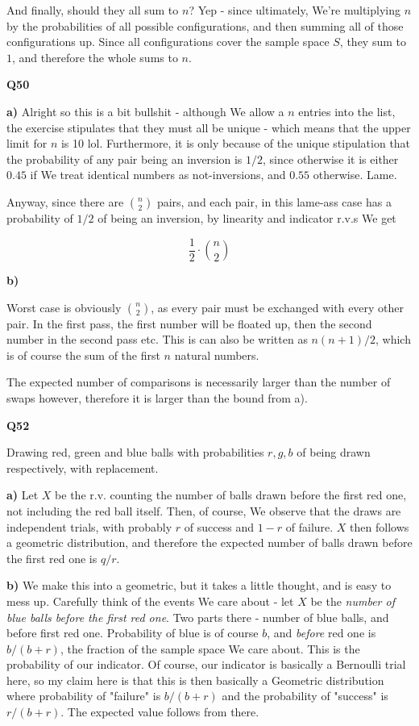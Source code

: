 \documentclass{article}
\begin{document}
		And finally, should they all sum to $n$? Yep - since ultimately, We're multiplying $n$ by the probabilities of all possible configurations, and then summing all of those configurations up. Since all configurations cover the sample space $S$, they sum to $1$, and therefore the whole sums to $n$.
		
		\hfill
		
		\textbf{Q50}
		
		\textbf{a)} Alright so this is a bit bullshit - although We allow a $n$ entries into the list, the exercise stipulates that they must all be unique - which means that the upper limit for $n$ is 10 lol. Furthermore, it is only because of the unique stipulation that the probability of any pair being an inversion is $1/2$, since otherwise it is either $0.45$ if We treat identical numbers as not-inversions, and $0.55$ otherwise. Lame. 
		
		Anyway, since there are ${n\choose 2}$ pairs, and each pair, in this lame-ass case has a probability of $1/2$ of being an inversion, by linearity and indicator r.v.s We get
		
		\[ \frac{1}{2}\cdot{n\choose 2} \] 
		
		\textbf{b)}
		
		Worst case is obviously ${n\choose 2}$, as every pair must be exchanged with every other pair. In the first pass, the first number will be floated up, then the second number in the second pass etc. This is can also be written as $n(n+1)/2$, which is of course the sum of the first $n$ natural numbers.
		
		The expected number of comparisons is necessarily larger than the number of swaps however, therefore it is larger than the bound from a).
		
		\hfill
		
		\textbf{Q52}
		
		Drawing red, green and blue balls with probabilities $r, g, b$ of being drawn respectively, with replacement.
		
		\textbf{a)} Let $X$ be the r.v. counting the number of balls drawn before the first red one, not including the red ball itself. Then, of course, We observe that the draws are independent trials, with probably $r$ of success and $1-r$ of failure. $X$ then follows a geometric distribution, and therefore the expected number of balls drawn before the first red one is $q/r$.
		
		\textbf{b)} We make this into a geometric, but it takes a little thought, and is easy to mess up. Carefully think of the events We care about - let $X$ be the \textit{number of blue balls before the first red one}. Two parts there - number of blue balls, and before first red one. Probability of blue is of course $b$, and \textit{before} red one is $b/(b+r)$, the fraction of the sample space We care about. This is the probability of our indicator. Of course, our indicator is basically a Bernoulli trial here, so my claim here is that this is then basically a Geometric distribution where probability of "failure" is $b/(b+r)$ and the probability of "success" is $r/(b+r)$. The expected value follows from there.
		
\end{document}
